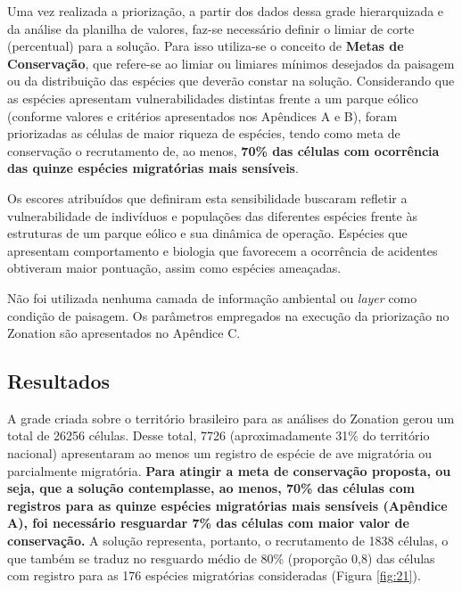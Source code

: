 \documentclass[
  oneside]{scrbook}
\begin{document}
Uma vez realizada a priorização, a partir dos dados dessa grade hierarquizada e da análise da planilha de valores, faz-se necessário definir o limiar de corte (percentual) para a solução. Para isso utiliza-se o conceito de \textbf{Metas de Conservação}, que refere-se ao limiar ou limiares mínimos desejados da paisagem ou da distribuição das espécies que deverão constar na solução. Considerando que as espécies apresentam vulnerabilidades distintas frente a um parque eólico (conforme valores e critérios apresentados nos Apêndices A e B), foram priorizadas as células de maior riqueza de espécies, tendo como meta de conservação o recrutamento de, ao menos, \textbf{70\% das células com ocorrência das quinze espécies migratórias mais sensíveis}.

Os escores atribuídos que definiram esta sensibilidade buscaram refletir a vulnerabilidade de indivíduos e populações das diferentes espécies frente às estruturas de um parque eólico e sua dinâmica de operação. Espécies que apresentam comportamento e biologia que favorecem a ocorrência de acidentes obtiveram maior pontuação, assim como espécies ameaçadas.

Não foi utilizada nenhuma camada de informação ambiental ou \emph{layer} como condição de paisagem. Os parâmetros empregados na execução da priorização no Zonation são apresentados no Apêndice C.

\hypertarget{resultados}{%
\subsection{Resultados}\label{resultados}}

A grade criada sobre o território brasileiro para as análises do Zonation gerou um total de 26256 células. Desse total, 7726 (aproximadamente 31\% do território nacional) apresentaram ao menos um registro de espécie de ave migratória ou parcialmente migratória. \textbf{Para atingir a meta de conservação proposta, ou seja, que a solução contemplasse, ao menos, 70\% das células com registros para as quinze espécies migratórias mais sensíveis (Apêndice A), foi necessário resguardar 7\% das células com maior valor de conservação.} A solução representa, portanto, o recrutamento de 1838 células, o que também se traduz no resguardo médio de 80\% (proporção 0,8) das células com registro para as 176 espécies migratórias consideradas (Figura \ref{fig:21}).
\end{document}
